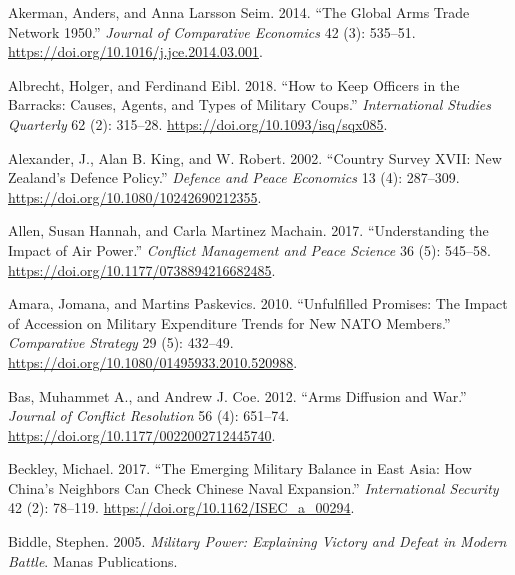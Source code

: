 \documentclass[
]{article}
\newlength{\cslhangindent}
\newlength{\cslentryspacingunit} %
\newenvironment{CSLReferences}[2] %
 {%
  \setlength{\parindent}{0pt}
  \ifodd #1
  \let\oldpar\par
  \def\par{\hangindent=\cslhangindent\oldpar}
  \fi
  \setlength{\parskip}{#2\cslentryspacingunit}
 }%
 {}
\begin{document}
\hypertarget{refs}{}
\begin{CSLReferences}{1}{0}
\leavevmode{}%
Akerman, Anders, and Anna Larsson Seim. 2014. {``The Global Arms Trade Network 1950.''} \emph{Journal of Comparative Economics} 42 (3): 535--51. \url{https://doi.org/10.1016/j.jce.2014.03.001}.

\leavevmode{}%
Albrecht, Holger, and Ferdinand Eibl. 2018. {``How to {Keep Officers} in the {Barracks}: {Causes}, {Agents}, and {Types} of {Military Coups}.''} \emph{International Studies Quarterly} 62 (2): 315--28. \url{https://doi.org/10.1093/isq/sqx085}.

\leavevmode{}%
Alexander, J., Alan B. King, and W. Robert. 2002. {``Country Survey {XVII}: {New} Zealand's Defence Policy.''} \emph{Defence and Peace Economics} 13 (4): 287--309. \url{https://doi.org/10.1080/10242690212355}.

\leavevmode{}%
Allen, Susan Hannah, and Carla Martinez Machain. 2017. {``Understanding the Impact of Air Power.''} \emph{Conflict Management and Peace Science} 36 (5): 545--58. \url{https://doi.org/10.1177/0738894216682485}.

\leavevmode{}%
Amara, Jomana, and Martins Paskevics. 2010. {``Unfulfilled {Promises}: {The Impact} of {Accession} on {Military Expenditure Trends} for {New NATO Members}.''} \emph{Comparative Strategy} 29 (5): 432--49. \url{https://doi.org/10.1080/01495933.2010.520988}.

\leavevmode{}%
Bas, Muhammet A., and Andrew J. Coe. 2012. {``Arms {Diffusion} and {War}.''} \emph{Journal of Conflict Resolution} 56 (4): 651--74. \url{https://doi.org/10.1177/0022002712445740}.

\leavevmode{}%
Beckley, Michael. 2017. {``The {Emerging Military Balance} in {East Asia}: {How China}'s {Neighbors Can Check Chinese Naval Expansion}.''} \emph{International Security} 42 (2): 78--119. \url{https://doi.org/10.1162/ISEC_a_00294}.

\leavevmode{}%
Biddle, Stephen. 2005. \emph{Military {Power}: {Explaining Victory} and {Defeat} in {Modern Battle}}. {Manas Publications}.


\end{CSLReferences}
\end{document}
